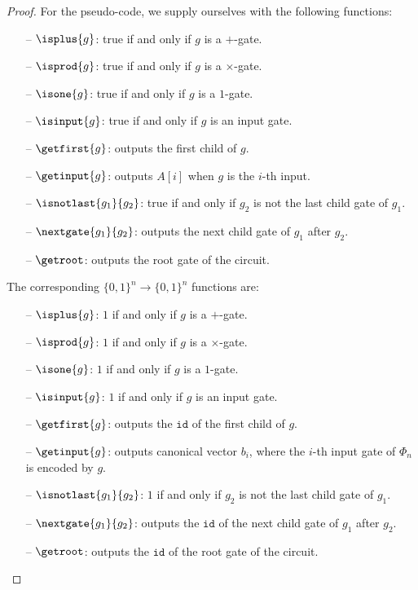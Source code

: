 \begin{proof}
For the pseudo-code, we supply ourselves with the following functions:

\begin{itemize}
	\item[--] $\isplus{g}$: true if and only if $g$ is a $+$-gate.
	\item[--] $\isprod{g}$: true if and only if $g$ is a $\times$-gate.
	\item[--] $\isone{g}$: true if and only if $g$ is a $1$-gate.
	\item[--] $\isinput{g}$: true if and only if $g$ is an input gate.
	\item[--] $\getfirst{g}$: outputs the first child of $g$.
	\item[--] $\getinput{g}$: outputs $A[i]$ when $g$ is the $i$-th input.
	\item[--] $\isnotlast{g_1}{g_2}$: true if and only if $g_2$ is not the last child gate of $g_1$.
	\item[--] $\nextgate{g_1}{g_2}$: outputs the next child gate of $g_1$ after $g_2$.
	\item[--] $\getroot$: outputs the root gate of the circuit.
\end{itemize}

The corresponding $\lbrace 0,1 \rbrace^n\rightarrow\lbrace 0,1 \rbrace^n$ functions are:

\begin{itemize}
	\item[--] $\isplus{g}$: $1$ if and only if $g$ is a $+$-gate.
	\item[--] $\isprod{g}$: $1$ if and only if $g$ is a $\times$-gate.
	\item[--] $\isone{g}$: $1$ if and only if $g$ is a $1$-gate.
	\item[--] $\isinput{g}$: $1$ if and only if $g$ is an input gate.
	\item[--] $\getfirst{g}$: outputs the $\texttt{id}$ of the first child of $g$.
	\item[--] $\getinput{g}$: outputs canonical vector $b_i$, where the $i$-th input gate of $\Phi_n$ is encoded by $g$.
	\item[--] $\isnotlast{g_1}{g_2}$: $1$ if and only if $g_2$ is not the last child gate of $g_1$.
	\item[--] $\nextgate{g_1}{g_2}$: outputs the $\texttt{id}$ of the next child gate of $g_1$ after $g_2$.
	\item[--] $\getroot$: outputs the $\texttt{id}$ of the root gate of the circuit.
\end{itemize}


\end{proof}
